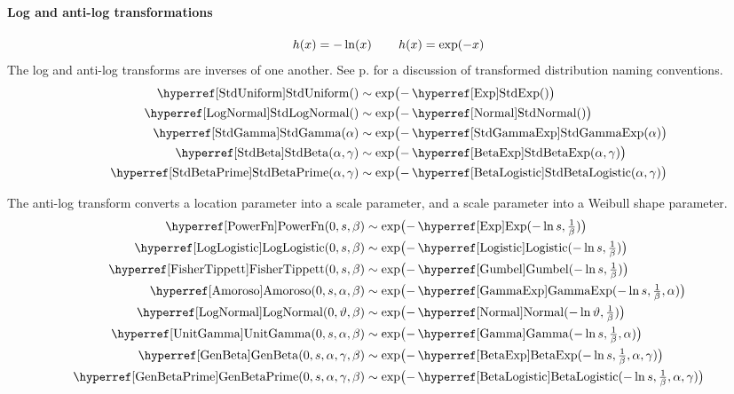 \paragraph*{Log and anti-log transformations}
\label{logtransform}
\[
h(x) = - \ln(x) \, \qquad
h(x) = \exp(-x)
\notag
\checked
\]
The log and anti-log transforms are inverses of one another. See p.\pageref{log-transform-name} for a discussion of transformed distribution naming conventions.
\begin{align*}
\opr{StdUniform}() &\sim \exp\bigl(-\oprr{StdExp}{Exp}()\bigr) \checked
\\
\oprr{StdLogNormal}{LogNormal}() &\sim \exp\bigl(-\oprr{StdNormal}{Normal}()\bigr) \checked
\\
\opr{StdGamma}(\alpha) &\sim \exp\bigl(-\opr{StdGammaExp}(\alpha)\bigr)  \checked
\\
\opr{StdBeta}(\alpha,\gamma) & \sim \exp\bigl(-\oprr{StdBetaExp}{BetaExp}(\alpha,\gamma)\bigr)  \checked
\\
 \opr{StdBetaPrime}(\alpha,\gamma) & \sim \exp\bigl(-\oprr{StdBetaLogistic}{BetaLogistic}(\alpha,\gamma)\bigr)  \checked
\end{align*}

The anti-log transform converts a location parameter into a scale parameter, and a scale parameter into a Weibull shape parameter. 
\begin{align*}
\opr{PowerFn}(0,s,\beta) &\sim  \exp\bigl(-\opr{Exp}(-\ln s ,\sfrac{1}{\beta} )\bigr) 
\checked
\\
\opr{LogLogistic}(0,s,\beta) &\sim  \exp\bigl(-\opr{Logistic}(-\ln s,\sfrac{1}{\beta})\bigr) 
\checked
\\
\opr{FisherTippett}(0,s,\beta) & \sim \exp\bigl(-\opr{Gumbel}(-\ln s,\sfrac{1}{\beta})\bigr) 
\checked
\\
\opr{Amoroso}(0,s, \alpha,\beta) &\sim \exp\bigl(-\opr{GammaExp}(-\ln s, \sfrac{1}{\beta}, \alpha)\bigr) 
\checked
\\
\opr{LogNormal}(0,\vartheta,\beta) &\sim \exp\bigl(-\opr{Normal}(-\ln \vartheta,\sfrac{1}{\beta})\bigr)  
\checked
 \\ 
 \opr{UnitGamma}(0,s, \alpha, \beta) &\sim \exp\bigl(- \opr{Gamma}(-\ln s,\sfrac{1}{\beta}, \alpha)\bigr) 
 \checked
\\
\opr{GenBeta}(0,s,\alpha,\gamma,\beta) & \sim \exp\bigl(-\opr{BetaExp}(-\ln s,\sfrac{1}{\beta},\alpha,\gamma)\bigr) 
\checked
\\
 \opr{GenBetaPrime}(0,s,\alpha,\gamma,\beta) & \sim \exp\bigl(-\opr{BetaLogistic}(-\ln s, \sfrac{1}{\beta}, \alpha,\gamma)\bigr) 
\checked
\end{align*}



